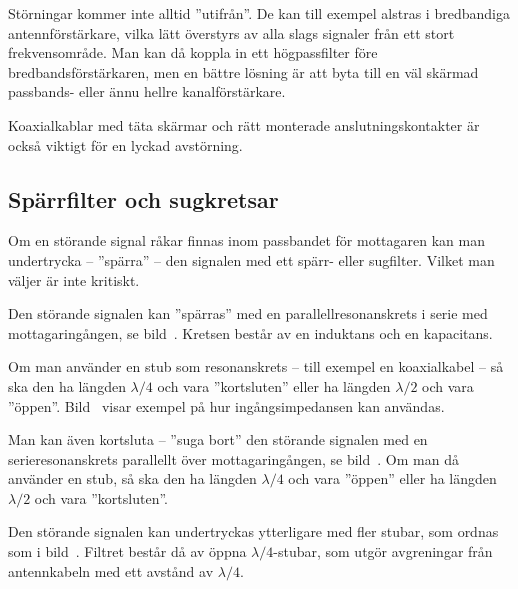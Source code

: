 Störningar kommer inte alltid ''utifrån''.
De kan till exempel alstras i bredbandiga antennförstärkare, vilka lätt
överstyrs av alla slags signaler från ett stort frekvensområde.
Man kan då koppla in ett högpassfilter före bredbandsförstärkaren, men en
bättre lösning är att byta till en väl skärmad passbands- eller ännu hellre
kanalförstärkare.

Koaxialkablar med täta skärmar och rätt monterade anslutningskontakter är också
viktigt för en lyckad avstörning.


\subsection{Spärrfilter och sugkretsar}
\label{subsec:spaerrfilter}
\label{Sugkretsar}


Om en störande signal råkar finnas inom passbandet för mottagaren kan
man undertrycka -- ''spärra'' -- den signalen med ett spärr- eller sugfilter.
Vilket man väljer är inte kritiskt.

Den störande signalen kan ''spärras'' med en parallellresonanskrets i
serie med mottagaringången, se bild~.
Kretsen består av en induktans och en kapacitans.

Om man använder en stub som resonanskrets -- till exempel en koaxialkabel -- så
ska den ha längden \(\lambda/4\) och vara ''kortsluten'' eller ha
längden \(\lambda/2\) och vara ''öppen''.
Bild~ visar exempel på hur ingångsimpedansen kan användas.

Man kan även kortsluta -- ''suga bort'' den störande signalen med en
serieresonanskrets parallellt över mottagaringången, se bild~.
Om man då använder en stub, så ska den ha längden \(\lambda/4\) och
vara ''öppen'' eller ha längden \(\lambda/2\) och vara ''kortsluten''.

Den störande signalen kan undertryckas ytterligare med fler stubar,
som ordnas som i bild~.
Filtret består då av öppna \(\lambda/4\)-stubar, som utgör avgreningar från
antennkabeln med ett avstånd av \(\lambda/4\).

